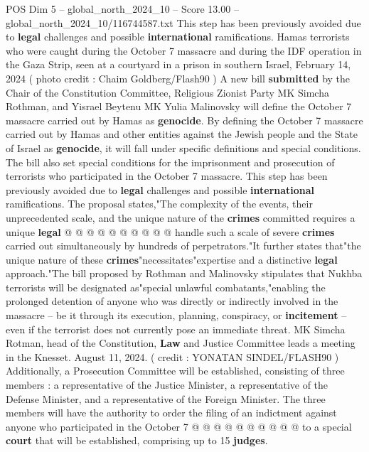 \begin{textsample}{POS Dim 5 – global\_north\_2024\_10 – Score 13.00 – global\_north\_2024\_10/116744587.txt}  \label{ex:f5_pos_404}
This step has been previously avoided due to \textbf{legal} challenges and possible \textbf{international} ramifications.
Hamas terrorists who were caught during the October 7 massacre and during the IDF operation in the Gaza Strip, seen at a courtyard in a prison in southern Israel, February 14, 2024 ( photo credit : Chaim Goldberg/Flash90 ) A new bill \textbf{submitted} by the Chair of the Constitution Committee, Religious Zionist Party MK Simcha Rothman, and Yisrael Beytenu MK Yulia Malinovsky will define the October 7 massacre carried out by Hamas as \textbf{genocide}.
By defining the October 7 massacre carried out by Hamas and other entities against the Jewish people and the State of Israel as \textbf{genocide}, it will fall under specific definitions and special conditions.
The bill also set special conditions for the imprisonment and prosecution of terrorists who participated in the October 7 massacre.
This step has been previously avoided due to \textbf{legal} challenges and possible \textbf{international} ramifications.
The proposal states,"The complexity of the events, their unprecedented scale, and the unique nature of the \textbf{crimes} committed requires a unique \textbf{legal} @ @ @ @ @ @ @ @ @ @ handle such a scale of severe \textbf{crimes} carried out simultaneously by hundreds of perpetrators."It further states that"the unique nature of these \textbf{crimes}"necessitates"expertise and a distinctive \textbf{legal} approach."The bill proposed by Rothman and Malinovsky stipulates that Nukhba terrorists will be designated as"special unlawful combatants,"enabling the prolonged detention of anyone who was directly or indirectly involved in the massacre -- be it through its execution, planning, conspiracy, or \textbf{incitement} -- even if the terrorist does not currently pose an immediate threat.
MK Simcha Rotman, head of the Constitution, \textbf{Law} and Justice Committee leads a meeting in the Knesset.
August 11, 2024. ( credit : YONATAN SINDEL/FLASH90 ) Additionally, a Prosecution Committee will be established, consisting of three members : a representative of the Justice Minister, a representative of the Defense Minister, and a representative of the Foreign Minister.
The three members will have the authority to order the filing of an indictment against anyone who participated in the October 7 @ @ @ @ @ @ @ @ @ @ to a special \textbf{court} that will be established, comprising up to 15 \textbf{judges}.

\end{textsample}
